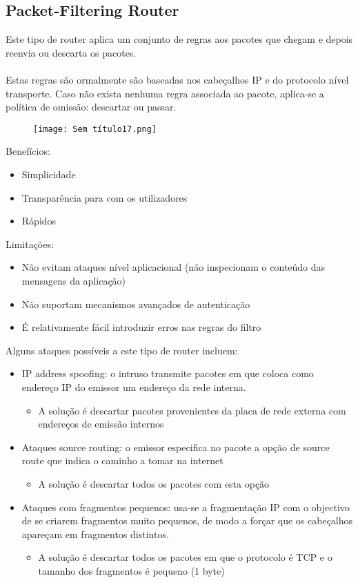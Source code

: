 \documentclass[10pt,a4paper]{report}
\begin{document}
\subsection{Packet-Filtering Router}
Este tipo de router aplica um conjunto de regras aos pacotes que chegam e depois reenvia ou descarta os pacotes.\\
\\
Estas regras são ormalmente são baseadas nos cabeçalhos IP e do protocolo nível transporte. Caso não exista nenhuma regra associada ao pacote, aplica-se a política de omissão: descartar ou passar.
\begin{figure}[H]
\centering
\texttt{[image: Sem título17.png]}
\end{figure}
Benefícios:
\begin{itemize}
\item Simplicidade
\item Transparência para com os utilizadores
\item Rápidos
\end{itemize}
Limitações:
\begin{itemize}
\item Não evitam ataques nível aplicacional (não inspecionam o conteúdo das mensagens da aplicação)
\item Não suportam mecanismos avançados de autenticação
\item É relativamente fácil introduzir erros nas regras do filtro
\end{itemize}
Alguns ataques possíveis a este tipo de router incluem:
\begin{itemize}
\item IP address spoofing: o intruso transmite pacotes em que coloca como
endereço IP do emissor um endereço da rede interna.
\begin{itemize}
\item A solução é descartar pacotes provenientes da placa de rede externa com endereços de emissão internos
\end{itemize}
\item Ataques source routing: o emissor especifica no pacote a opção de source
route que indica o caminho a tomar na internet
\begin{itemize}
\item A solução é descartar todos os pacotes com esta opção
\end{itemize}
\item Ataques com fragmentos pequenos: usa-se a fragmentação IP com o
objectivo de se criarem fragmentos muito pequenos, de modo a forçar que os cabeçalhos apareçam em fragmentos distintos.
\begin{itemize}
\item A solução é descartar todos os pacotes em que o protocolo é TCP e o tamanho dos fragmentos é pequeno (1 byte)
\end{itemize}
\end{itemize}
\end{document}
